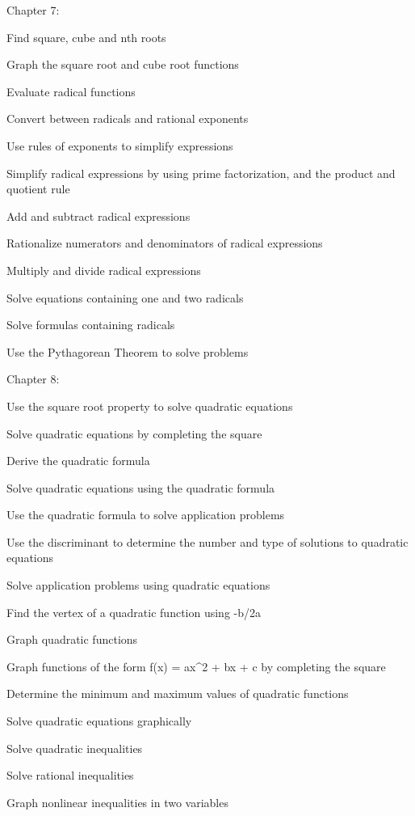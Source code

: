 Chapter 7:
\begin{alphalist}
    \item Find square, cube and nth roots
    \item Graph the square root and cube root functions
    \item Evaluate radical functions
    \item Convert between radicals and rational exponents
    \item Use rules of exponents to simplify expressions
    \item Simplify radical expressions by using prime factorization, and the product and quotient rule
    \item Add and subtract radical expressions
    \item Rationalize numerators and denominators of radical expressions
    \item Multiply and divide radical expressions
    \item Solve equations containing one and two radicals
    \item Solve formulas containing radicals
    \item Use the Pythagorean Theorem to solve problems 
\end{alphalist}
Chapter 8:
\begin{alphalist}
    \item Use the square root property to solve quadratic equations
    \item Solve quadratic equations by completing the square
    \item Derive the quadratic formula
    \item Solve quadratic equations using the quadratic formula
    \item Use the quadratic formula to solve application problems
    \item Use the discriminant to determine the number and type of solutions to quadratic equations
    \item Solve application problems using quadratic equations
    \item Find the vertex of a quadratic function using -b/2a
    \item Graph quadratic functions
    \item Graph functions of the form f(x) = ax^2 + bx + c by completing the square
    \item Determine the minimum and maximum values of quadratic functions
    \item Solve quadratic equations graphically
    \item Solve quadratic inequalities
    \item Solve rational inequalities
    \item Graph nonlinear inequalities in two variables
\end{alphalist}

